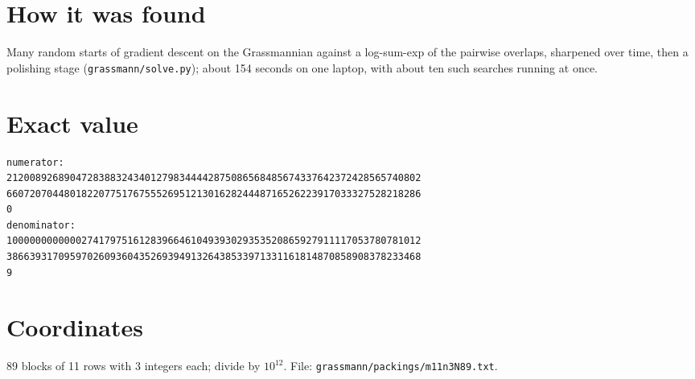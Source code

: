 \documentclass[11pt,a4paper]{article}
\begin{document}
\section{How it was found}
Many random starts of gradient descent on the Grassmannian against a log-sum-exp of the pairwise overlaps, sharpened over time, then a polishing stage (\texttt{grassmann/solve.py}); about 154 seconds on one laptop, with about ten such searches running at once.


\appendix
\section{Exact value}
{\small
\begin{verbatim}
numerator:
212008926890472838832434012798344442875086568485674337642372428565740802
660720704480182207751767555269512130162824448716526223917033327528218286
0
denominator:
100000000000027417975161283966461049393029353520865927911117053780781012
386639317095970260936043526939491326438533971331161814870858908378233468
9
\end{verbatim}}

\section{Coordinates}
89 blocks of 11 rows with 3 integers each; divide by $10^{12}$. File: \texttt{grassmann/packings/m11n3N89.txt}.
{\tiny
\begin{multicols}{3}
\end{multicols}}
\end{document}
